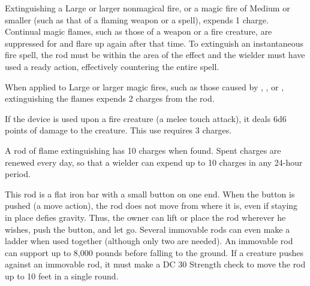 Extinguishing a Large or larger nonmagical fire, or a magic fire of Medium or smaller (such as that of a flaming weapon or a  spell), expends 1 charge. Continual magic flames, such as those of a weapon or a fire creature, are suppressed for  and flare up again after that time. To extinguish an instantaneous fire spell, the rod must be within the area of the effect and the wielder must have used a ready action, effectively countering the entire spell.

When applied to Large or larger magic fires, such as those caused by , , or , extinguishing the flames expends 2 charges from the rod.

If the device is used upon a fire creature (a melee touch attack), it deals 6d6 points of damage to the creature. This use requires 3 charges.

A rod of flame extinguishing has 10 charges when found. Spent charges are renewed every day, so that a wielder can expend up to 10 charges in any 24-hour period.


 This rod is a flat iron bar with a small button on one end. When the button is pushed (a move action), the rod does not move from where it is, even if staying in place defies gravity. Thus, the owner can lift or place the rod wherever he wishes, push the button, and let go. Several immovable rods can even make a ladder when used together (although only two are needed). An immovable rod can support up to 8,000 pounds before falling to the ground. If a creature pushes against an immovable rod, it must make a DC 30 Strength check to move the rod up to 10 feet in a single round.


